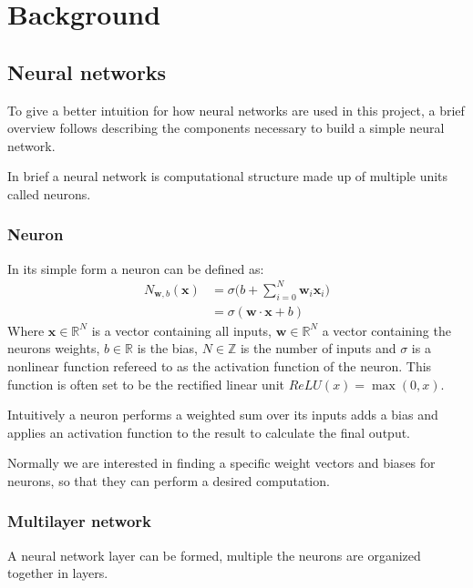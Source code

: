 \documentclass[a4paper, twoside, 10pt]{report}
\begin{document}
\tableofcontents

\clearpage




\chapter{Background}
\section{Neural networks}
To give a better intuition for how neural networks are used in this project, a brief overview follows describing the components necessary to build a simple neural network. 

In brief a neural network is computational structure made up of multiple units called neurons.

\subsection{Neuron}
In its simple form a neuron can be defined as:
\begin{equation}
\begin{split}
N_{\boldsymbol w, b}(\boldsymbol{x}) & = \sigma\Bigg(b + \sum_{i=0}^{N}{\boldsymbol{w}_i \boldsymbol{x}_i}\Bigg) \\
& = \sigma (\boldsymbol{w} \cdot \boldsymbol{x} + b)
\end{split}
\end{equation}
Where $\boldsymbol{x} \in \mathbb{R}^N$ is a vector containing all inputs, $ \boldsymbol{w} \in \mathbb{R}^N$ a vector containing the neurons weights, $b \in \mathbb{R}$ is the bias, $N \in \mathbb{Z}$ is the number of inputs and $\sigma$ is a nonlinear function refereed to as the activation function of the neuron. This function is often set to be the rectified linear unit $ReLU(x) = \max(0, x)$.

Intuitively a neuron performs a weighted sum over its inputs adds a bias and applies an activation function to the result to calculate the final output.

Normally we are interested in finding a specific weight vectors and biases for neurons, so that they can perform a desired computation.


\subsection{Multilayer network}
A neural network layer can be formed, multiple  the neurons are organized together in layers.
\multilayerNetworkGraph
\end{document}

